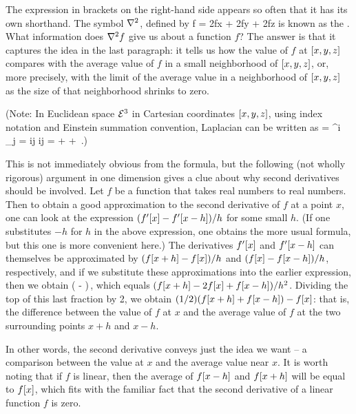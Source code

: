 The expression in brackets on the right-hand side appears so often that it has its own shorthand. The symbol $\nabla^2$, defined by
\beq
\lder f = \nxpd 2fx + \nxpd 2fy + \nxpd 2fz
\eeq
is known as the . What information does $\nabla^2 f$ give us about a function $f$? The answer is that it captures the idea in the last paragraph: it tells us how the value of $f$ at $\left[{x,y,z}\right]$ compares with the average value of $f$ in a small neighborhood of $\left[{x,y,z}\right]$, or, more precisely, with the limit of the average value in a neighborhood of $\left[{x,y,z}\right]$ as the size of that neighborhood shrinks to zero.

(Note: In Euclidean space $\mathcal{E}^{3}$ in Cartesian coordinates $\left[{x,y,z}\right]$, using index notation and Einstein summation convention, Laplacian can be written as
\beq
\lder = \partial^i \partial_j
      = \rmet ij \igder i\igder j
      =  +  +  \,.)
\eeq

This is not immediately obvious from the formula, but the following (not wholly rigorous) argument in one dimension gives a clue about why second derivatives should be involved. Let $f$ be a function that takes real numbers to real numbers. Then to obtain a good approximation to the second derivative of $f$ at a point $x$, one can look at the expression $(f'\!\left[{x}\right] - f'\!\left[{x-h}\right])/h$ for some small $h$. (If one substitutes $-h$ for $h$ in the above expression, one obtains the more usual formula, but this one is more convenient here.) The derivatives $f'\!\left[{x}\right]$ and $f'\!\left[{x-h}\right]$ can themselves be approximated by $(f\!\left[{x+h}\right] - f\!\left[{x}\right])/h$ and $(f\!\left[{x}\right] - f\!\left[{x-h}\right])/h$, respectively, and if we substitute these approximations into the earlier expression, then we obtain
\beq
{}\left(  -  \right)\,,
\eeq
which equals $(f\!\left[{x+h}\right] - 2f\!\left[{x}\right] + f\!\left[{x-h}\right])/h^2$. Dividing the top of this last fraction by 2, we obtain
$(1/2)(f\!\left[{x+h}\right] + f\!\left[{x-h}\right]) - f\!\left[{x}\right]$: that is, the difference between the value of $f$ at $x$ and the average value of $f$ at the two surrounding points $x + h$ and $x - h$.

In other words, the second derivative conveys just the idea we want -- a comparison between the value at $x$ and the average value near $x$. It is worth noting that if $f$ is linear, then the average of $f\!\left[{x-h}\right]$ and $f\!\left[{x+h}\right]$ will be equal to $f\!\left[{x}\right]$, which fits with the familiar fact that the second derivative of a linear function $f$ is zero.

